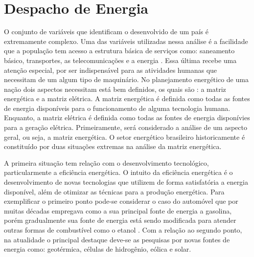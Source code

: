 \chapter{Despacho de Energia}
O conjunto de vari\'aveis que identificam o desenvolvido de um pa\'is \'e extremamente complexo. Uma das vari\'aveis
utilizadas nessa
an\'alise \'e a facilidade que a popula\c c\~ao tem acesso a estrutura b\'asica de servi\c cos como: saneamento
b\'asico, transportes, as telecomunica\c c\~oes e a energia \cite{an}. Essa \'ultima recebe uma aten\c c\~ao especial,
por ser 
indispens\'avel para as atividades humanas que necessitam de um algum tipo de maquin\'ario. No planejamento energ\'etico de uma na\c
c\~ao dois aspectos necessitam est\'a bem definidos, os quais s\~ao : a matriz energ\'etica e a matriz el\'etrica. A matriz
energ\'etica \'e definida como todas as fontes de energia dispon\'iveis para o funcionamento de alguma tecnologia
humana. Enquanto, a matriz el\'etrica \'e definida como todas as fontes de energia dispon\'ivies para a gera\c c\~ao
el\'etrica. Primeiramente, ser\'a considerado a an\'alise de um aspecto geral, ou seja, a matriz energ\'etica. O
 setor energ\'etico brasileiro historicamente \'e constitu\'ido por duas situa\c c\~oes extremas na an\'alise da matriz
 energ\'etica. 

A primeira situa\c c\~ao tem rela\c c\~ao
com o desenvolvimento tecnol\'ogico, particularmente a efici\^encia energ\'etica. O intuito da efici\^encia energ\'etica
\'e o desenvolvimento de novas tecnologias que utilizem de forma satisfat\'oria a energia dispon\'ivel, al\'em de 
otimizar as t\'ecnicas para a produ\c c\~ao energ\'etica. Para exemplificar o primeiro ponto pode-se
considerar o caso do autom\'ovel que por muitas d\'ecadas empregava como a sua principal fonte de energia a gasolina,
por\'em gradualmente sua fonte de energia est\'a sendo modificada para atender outras formas de combust\'ivel como o
etanol \cite{an}. Com a rela\c c\~ao ao segundo ponto, na atualidade o principal destaque deve-se as pesquisas por novas
fontes de energia como: geot\'ermica, c\'elulas de hidrog\^enio, e\'olica e solar.

